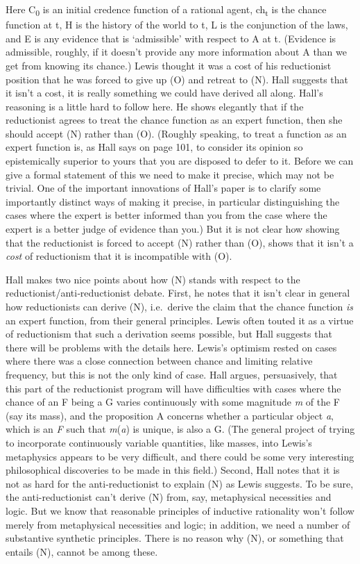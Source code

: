 \documentclass[
  10pt,
  letterpaper,
  DIV=11,
  numbers=noendperiod,
  twoside]{scrartcl}
\begin{document}
Here C\textsubscript{0} is an initial credence function of a rational
agent, ch\textsubscript{t} is the chance function at t, H is the history
of the world to t, L is the conjunction of the laws, and E is any
evidence that is `admissible' with respect to A at t. (Evidence is
admissible, roughly, if it doesn't provide any more information about A
than we get from knowing its chance.) Lewis thought it was a cost of his
reductionist position that he was forced to give up (O) and retreat to
(N). Hall suggests that it isn't a cost, it is really something we could
have derived all along. Hall's reasoning is a little hard to follow
here. He shows elegantly that if the reductionist agrees to treat the
chance function as an expert function, then she should accept (N) rather
than (O). (Roughly speaking, to treat a function as an expert function
is, as Hall says on page 101, to consider its opinion so epistemically
superior to yours that you are disposed to defer to it. Before we can
give a formal statement of this we need to make it precise, which may
not be trivial. One of the important innovations of Hall's paper is to
clarify some importantly distinct ways of making it precise, in
particular distinguishing the cases where the expert is better informed
than you from the case where the expert is a better judge of evidence
than you.) But it is not clear how showing that the reductionist is
forced to accept (N) rather than (O), shows that it isn't a \emph{cost}
of reductionism that it is incompatible with (O).

Hall makes two nice points about how (N) stands with respect to the
reductionist/anti‑reductionist debate. First, he notes that it isn't
clear in general how reductionists can derive (N), i.e.~derive the claim
that the chance function \emph{is} an expert function, from their
general principles. Lewis often touted it as a virtue of reductionism
that such a derivation seems possible, but Hall suggests that there will
be problems with the details here. Lewis's optimism rested on cases
where there was a close connection between chance and limiting relative
frequency, but this is not the only kind of case. Hall argues,
persuasively, that this part of the reductionist program will have
difficulties with cases where the chance of an F being a G varies
continuously with some magnitude \emph{m} of the F (say its mass), and
the proposition A concerns whether a particular object \emph{a}, which
is an \emph{F} such that \emph{m}(\emph{a}) is unique, is also a G. (The
general project of trying to incorporate continuously variable
quantities, like masses, into Lewis's metaphysics appears to be very
difficult, and there could be some very interesting philosophical
discoveries to be made in this field.) Second, Hall notes that it is not
as hard for the anti‑reductionist to explain (N) as Lewis suggests. To
be sure, the anti-reductionist can't derive (N) from, say, metaphysical
necessities and logic. But we know that reasonable principles of
inductive rationality won't follow merely from metaphysical necessities
and logic; in addition, we need a number of substantive synthetic
principles. There is no reason why (N), or something that entails (N),
cannot be among these.
\end{document}
